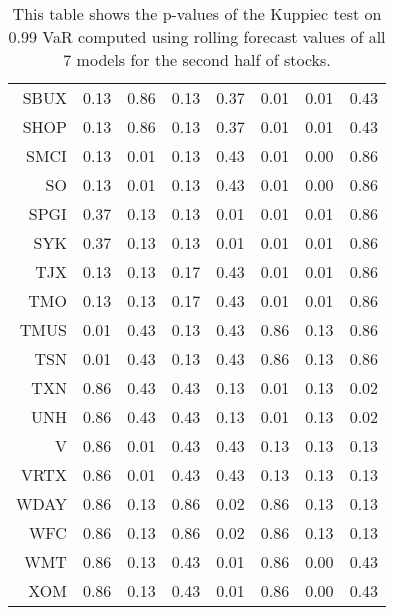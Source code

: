 \begin{table}[ht]
\begin{tabular}{rrrrrrrr}
  SBUX & 0.13 & 0.86 & 0.13 & 0.37 & 0.01 & 0.01 & 0.43 \\ 
  SHOP & 0.13 & 0.86 & 0.13 & 0.37 & 0.01 & 0.01 & 0.43 \\ 
  SMCI & 0.13 & 0.01 & 0.13 & 0.43 & 0.01 & 0.00 & 0.86 \\ 
  SO & 0.13 & 0.01 & 0.13 & 0.43 & 0.01 & 0.00 & 0.86 \\ 
  SPGI & 0.37 & 0.13 & 0.13 & 0.01 & 0.01 & 0.01 & 0.86 \\ 
  SYK & 0.37 & 0.13 & 0.13 & 0.01 & 0.01 & 0.01 & 0.86 \\ 
  TJX & 0.13 & 0.13 & 0.17 & 0.43 & 0.01 & 0.01 & 0.86 \\ 
  TMO & 0.13 & 0.13 & 0.17 & 0.43 & 0.01 & 0.01 & 0.86 \\ 
  TMUS & 0.01 & 0.43 & 0.13 & 0.43 & 0.86 & 0.13 & 0.86 \\ 
  TSN & 0.01 & 0.43 & 0.13 & 0.43 & 0.86 & 0.13 & 0.86 \\ 
  TXN & 0.86 & 0.43 & 0.43 & 0.13 & 0.01 & 0.13 & 0.02 \\ 
  UNH & 0.86 & 0.43 & 0.43 & 0.13 & 0.01 & 0.13 & 0.02 \\ 
  V & 0.86 & 0.01 & 0.43 & 0.43 & 0.13 & 0.13 & 0.13 \\ 
  VRTX & 0.86 & 0.01 & 0.43 & 0.43 & 0.13 & 0.13 & 0.13 \\ 
  WDAY & 0.86 & 0.13 & 0.86 & 0.02 & 0.86 & 0.13 & 0.13 \\ 
  WFC & 0.86 & 0.13 & 0.86 & 0.02 & 0.86 & 0.13 & 0.13 \\ 
  WMT & 0.86 & 0.13 & 0.43 & 0.01 & 0.86 & 0.00 & 0.43 \\ 
  XOM & 0.86 & 0.13 & 0.43 & 0.01 & 0.86 & 0.00 & 0.43 \\ 
   \hline
\end{tabular}
\caption[Kupiec test p-values, alpha =0.99 (2)]{This table shows the p-values of the Kuppiec test on 0.99 VaR computed using rolling forecast values of all 7 models for the second half of stocks.} 
\label{Table:Kupiec_test_rolling_0.99_2}
\end{table}
